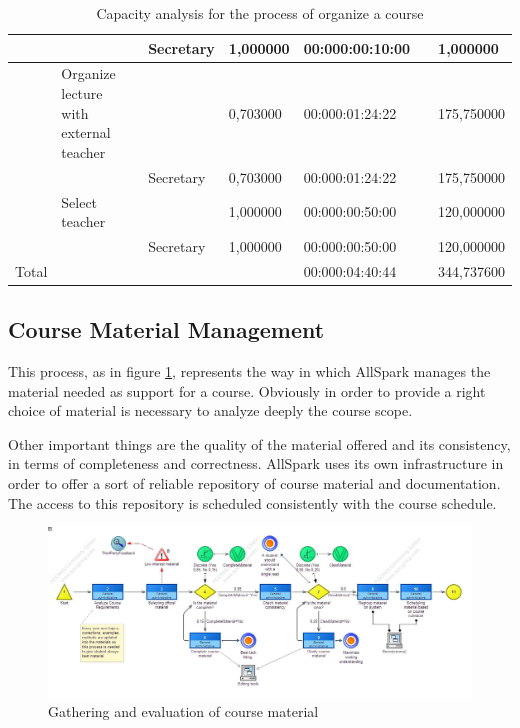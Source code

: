 \begin{landscape}
\begin{table}
{\begin{tabular}{|l|l|l|l|l|l|l|}
\hline
&&Secretary &1,000000&00:000:00:10:00&&1,000000\\
\hline
&Organize lecture with external teacher &&0,703000&00:000:01:24:22&&175,750000\\
\hline
&&Secretary &0,703000&00:000:01:24:22&&175,750000\\
\hline
&Select teacher &&1,000000&00:000:00:50:00&&120,000000\\
\hline
&&Secretary &1,000000&00:000:00:50:00&&120,000000\\
\hline
Total&&&&00:000:04:40:44&&344,737600\\
\hline
\end{tabular}
}
\caption{Capacity analysis for the process of organize a course} 
\label{2tab:course_org}
\end{table}
\end{landscape}




\subsection{Course Material Management}
This process, as in figure \ref{2img:course_material}, represents the way
in which AllSpark manages the material needed as support for a course.
Obviously in order to provide a right choice of material is necessary to
analyze deeply the course scope.

Other important things are the quality of the material offered and its
consistency, in terms of completeness and correctness. AllSpark uses its
own infrastructure in order to offer a sort of reliable repository of
course material and documentation. The access to this repository is
scheduled consistently with the course schedule.

\begin{figure}[!ht]
\centering
\includegraphics[scale=0.35, angle=90]{assign2/adonis/imgs/course_material.jpg}
\caption{Gathering and evaluation of course material}
\label{2img:course_material}
\end{figure}


